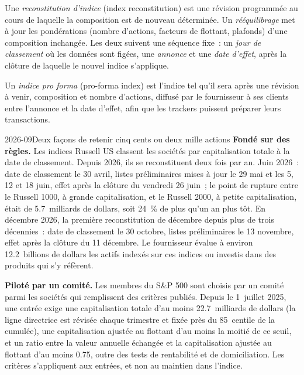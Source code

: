 \begin{definition}\label{def:m1:index-construction-and-rebalancing:recon}
Une \emph{reconstitution d'indice} (index reconstitution) est une révision programmée
au cours de laquelle la composition est de nouveau déterminée. Un \emph{rééquilibrage} met à jour
les pondérations (nombre d'actions, facteurs de flottant, plafonds) d'une composition inchangée.
Les deux suivent une séquence fixe~: un \emph{jour de classement} où les données sont
figées, une \emph{annonce} et une \emph{date d'effet}, après
la clôture de laquelle le nouvel indice s'applique.
\end{definition}

\begin{definition}\label{def:m1:index-construction-and-rebalancing:proforma}
Un \emph{indice pro forma} (pro-forma index) est l'indice tel qu'il sera
après une révision à venir, composition et nombre d'actions, diffusé par le
fournisseur à ses clients entre l'annonce et la date d'effet, afin que les
trackers puissent préparer leurs transactions.
\end{definition}

\begin{dated}{2026-09}{Deux façons de retenir cinq cents ou deux mille actions}\label{dat:m1:index-construction-and-rebalancing:rules}
\textbf{Fondé sur des règles.} Les indices Russell US classent les sociétés par
capitalisation totale à la date de classement. Depuis 2026, ils se reconstituent deux fois par an.
Juin 2026~: date de classement le 30 avril, listes préliminaires mises à jour le 29 mai et les 5, 12 et 18
juin, effet après la clôture du vendredi 26 juin~; le point de rupture entre
le Russell 1000, à grande capitalisation, et le Russell 2000, à petite capitalisation,
était de 5.7~milliards de dollars, soit 24~\% de plus qu'un an plus tôt. En décembre 2026, la
première reconstitution de décembre depuis plus de trois décennies~: date de classement le 30 octobre,
listes préliminaires le 13 novembre, effet après la clôture du 11 décembre.
Le fournisseur évalue à environ 12.2~billions de dollars les actifs indexés sur ces
indices ou investis dans des produits qui s'y réfèrent.

\textbf{Piloté par un comité.} Les membres du S\&P 500 sont choisis par un comité
parmi les sociétés qui remplissent des critères publiés. Depuis le 1~juillet 2025, une entrée
exige une capitalisation totale d'au moins 22.7~milliards de dollars (la ligne directrice est
révisée chaque trimestre et fixée près du 85~centile de la 
cumulée), une capitalisation ajustée au flottant d'au moins la moitié de ce
seuil, et un ratio entre la valeur annuelle échangée et la capitalisation ajustée au
flottant d'au moins 0.75, outre des tests de rentabilité et
de domiciliation. Les critères s'appliquent aux entrées, et non au maintien dans l'indice.
\end{dated}

